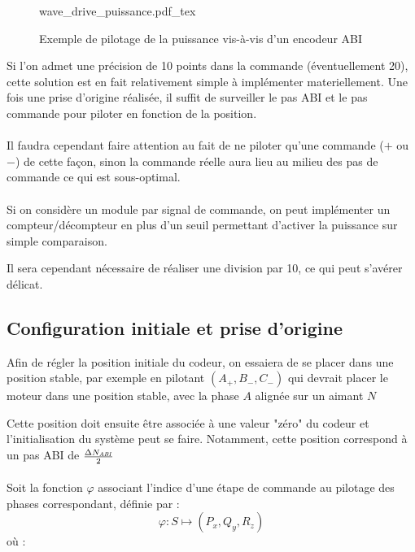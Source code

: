 \begin{figure}[h]
    \centering
    \def\svgwidth{17cm}
    \small
    {wave_drive_puissance.pdf_tex}
    \caption{Exemple de pilotage de la puissance vis-à-vis d'un encodeur ABI}
    \label{fig-wave_drive_wrt_abi}
\end{figure}

Si l'on admet une précision de 10 points dans la commande (éventuellement 20), cette solution est en fait relativement simple à implémenter materiellement.
Une fois une prise d'origine réalisée, il suffit de surveiller le pas ABI et le pas commande pour piloter en fonction de la position.

\paragraph{}
Il faudra cependant faire attention au fait de ne piloter qu'une commande ($+$ ou $-$) de cette façon, sinon la commande réelle aura lieu au milieu des pas de commande ce qui est sous-optimal.

\paragraph{}
Si on considère un module par signal de commande, on peut implémenter un compteur/décompteur en plus d'un seuil permettant d'activer la puissance sur simple comparaison.

Il sera cependant nécessaire de réaliser une division par 10, ce qui peut s'avérer délicat.

\subsection{Configuration initiale et prise d'origine}
Afin de régler la position initiale du codeur, on essaiera de se placer dans une position stable, par exemple en pilotant $(A_+, B_-, C_-)$ qui devrait placer le moteur dans une position stable, avec la phase $A$ alignée sur un aimant $N$

Cette position doit ensuite être associée à une valeur "zéro" du codeur et l'initialisation du système peut se faire.
Notamment, cette position correspond à un pas ABI de $\frac{\Delta N_\mathit{ABI}}{2}$


\paragraph{}
Soit la fonction $\varphi$ associant l'indice d'une étape de commande au pilotage des phases correspondant, définie par  :
$$\varphi : S \longmapsto (P_x,Q_y,R_z)$$
où :

